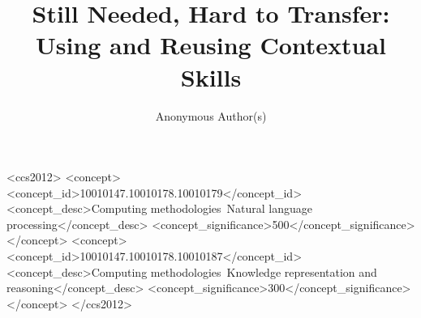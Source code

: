 \documentclass[sigconf, anonymous, review]{acmart}
\begin{document}
\title{Still Needed, Hard to Transfer: Using and Reusing Contextual Skills}

\author{Anonymous Author(s)}



\begin{CCSXML}
<ccs2012>
   <concept>
       <concept_id>10010147.10010178.10010179</concept_id>
       <concept_desc>Computing methodologies~Natural language processing</concept_desc>
       <concept_significance>500</concept_significance>
       </concept>
   <concept>
       <concept_id>10010147.10010178.10010187</concept_id>
       <concept_desc>Computing methodologies~Knowledge representation and reasoning</concept_desc>
       <concept_significance>300</concept_significance>
       </concept>
</ccs2012>
\end{CCSXML}


\maketitle







\label{endmain}




\appendix



\end{document}
